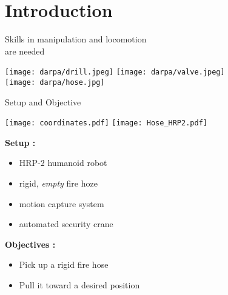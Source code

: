 \section{Introduction}

\setcounter{subsection}{1}

\begin{frame}{Skills in manipulation and locomotion\\ are needed}
\begin{center}
  \vspace*{0.7cm}
  \texttt{[image: darpa/drill.jpeg]}
  \hspace*{0.5cm}
  \texttt{[image: darpa/valve.jpeg]}\\[0.2cm]
  \texttt{[image: darpa/hose.jpg]}
\end{center}
\end{frame}



\begin{frame}{Setup and Objective}
\begin{center}
  \vspace*{0.7cm}
  \texttt{[image: coordinates.pdf]}
  \hspace*{1cm}
  \texttt{[image: Hose\_HRP2.pdf]}
\end{center}

\begin{center}
  \begin{minipage}{0.45\textwidth}
    \textbf{\color{blue} Setup :}
    \begin{itemize}
      \item HRP-2 humanoid robot
      \item rigid, \emph{empty} fire hoze
      \item motion capture system
      \item automated security crane
    \end{itemize}
  \end{minipage} 
  \begin{minipage}{0.45\textwidth}
    \textbf{\color{blue} Objectives :}
    \begin{itemize}
      \item Pick up a rigid fire hose
      \item Pull it toward a desired position
    \end{itemize}
    \vspace*{0.7cm}
  \end{minipage}
\end{center}
\end{frame}

